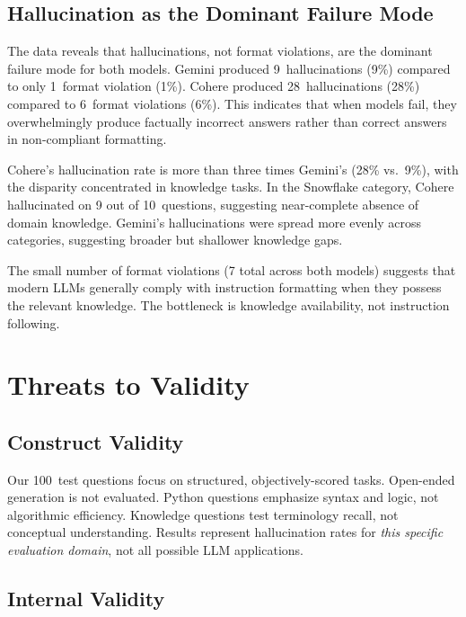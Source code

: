 \documentclass[conference]{IEEEtran}
\begin{document}
\subsection{Hallucination as the Dominant Failure Mode}

The data reveals that hallucinations, not format violations, are the dominant failure mode for both models. Gemini produced 9~hallucinations (9\%) compared to only 1~format violation (1\%). Cohere produced 28~hallucinations (28\%) compared to 6~format violations (6\%). This indicates that when models fail, they overwhelmingly produce factually incorrect answers rather than correct answers in non-compliant formatting.

Cohere's hallucination rate is more than three times Gemini's (28\% vs.\ 9\%), with the disparity concentrated in knowledge tasks. In the Snowflake category, Cohere hallucinated on 9 out of 10~questions, suggesting near-complete absence of domain knowledge. Gemini's hallucinations were spread more evenly across categories, suggesting broader but shallower knowledge gaps.

The small number of format violations (7 total across both models) suggests that modern LLMs generally comply with instruction formatting when they possess the relevant knowledge. The bottleneck is knowledge availability, not instruction following.

\section{Threats to Validity}

\subsection{Construct Validity}

Our 100~test questions focus on structured, objectively-scored tasks. Open-ended generation is not evaluated. Python questions emphasize syntax and logic, not algorithmic efficiency. Knowledge questions test terminology recall, not conceptual understanding. Results represent hallucination rates for \emph{this specific evaluation domain}, not all possible LLM applications.

\subsection{Internal Validity}
\end{document}
